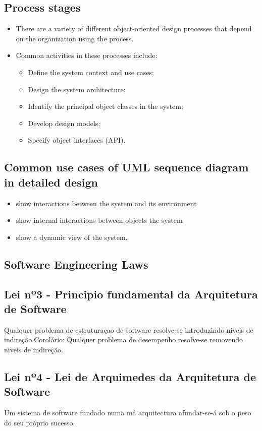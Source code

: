 \documentclass[../ESOF_notes.tex]{subfiles}
\begin{document}
\subsection{Process stages}
\begin{itemize}
    \item There are a variety of different object-oriented design processes that depend on the organization using the process.
    \item Common activities in these processes include:
          \begin{itemize}
              \item Define the system context and use cases;
              \item Design the system architecture;
              \item Identify the principal object classes in the system;
              \item Develop design models;
              \item Specify object interfaces (API).
          \end{itemize}
\end{itemize}

\subsection{Common use cases of UML sequence diagram in detailed design}
\begin{itemize}
    \item show interactions between the system and its environment
    \item show internal interactions between objects the system
    \item show a dynamic view of the system.
\end{itemize}


\subsection{Software Engineering Laws}

\subsection{Lei nº3 - Principio fundamental da Arquitetura de Software}
Qualquer problema de estruturaçao de software resolve-se introduzindo niveis de indireção.\newline Corolário: Qualquer problema de desempenho resolve-se removendo niveis de indireção.

\subsection{Lei nº4 - Lei de Arquimedes da Arquitetura de Software}
Um sistema de software fundado numa má arquitectura afundar-se-á sob o peso do seu próprio sucesso.
\end{document}
